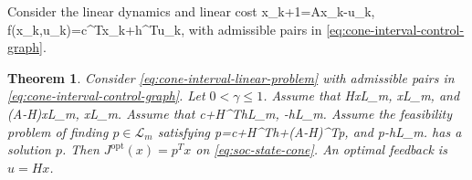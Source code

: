 \documentclass{article}
\newtheorem{theorem}{Theorem}
\begin{document}
Consider the linear dynamics and linear cost
\BEQ
x_{k+1}=Ax_k-u_k,
\quad
f(x_k,u_k)=c^Tx_k+h^Tu_k,
\label{eq:cone-interval-linear-problem}
\EEQ
with admissible pairs in \eqref{eq:cone-interval-control-graph}.

\begin{theorem}
\label{prop:cone-interval-exactness}
Consider \eqref{eq:cone-interval-linear-problem} with admissible pairs in \eqref{eq:cone-interval-control-graph}. Let $0<\gamma\leq1$. Assume that
\BEQ
Hx\in\mathcal L_m,
\quad x\in\mathcal L_m,
\label{eq:cone-interval-map-invariance}
\EEQ
and
\BEQ
(A-H)x\in\mathcal L_m,
\quad x\in\mathcal L_m.
\label{eq:cone-interval-state-invariance}
\EEQ
Assume that
\BEQ
c+H^Th\in{}\mathcal L_m,
\quad
-h\in{}\mathcal L_m.
\label{eq:cone-interval-cost-interior}
\EEQ
Assume the feasibility problem of finding $p\in\mathcal L_m$ satisfying
\BEQ
p=c+H^Th+\gamma(A-H)^Tp,
\label{eq:cone-interval-value-vector}
\EEQ
and
\BEQ
\gamma p-h\in\mathcal L_m.
\label{eq:cone-interval-endpoint-condition}
\EEQ
has a solution $p$. Then $J^\textrm{opt}(x)=p^Tx$ on \eqref{eq:soc-state-cone}. An optimal feedback is $u=Hx$.
\end{theorem}
\end{document}
